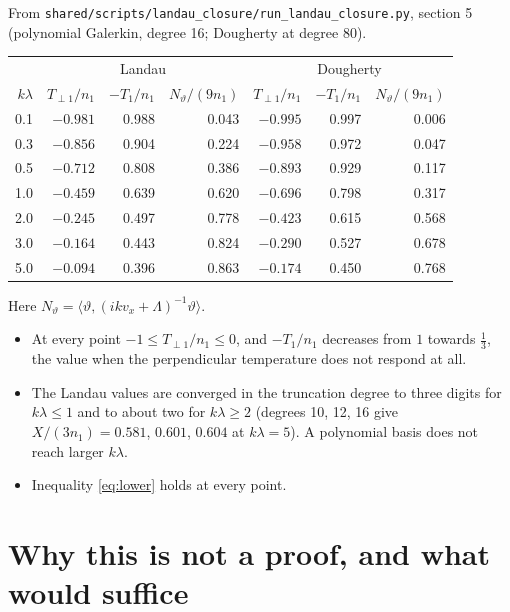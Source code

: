 \documentclass[11pt]{article}
\newcommand{\avg}[1]{\langle #1\rangle}
\newcommand{\Tperp}{T_{\perp1}}
\theoremstyle{remark}
\begin{document}
From \texttt{shared/scripts/landau\_closure/run\_landau\_closure.py},
section 5 (polynomial Galerkin, degree 16; Dougherty at degree 80).
\begin{center}
\renewcommand{\arraystretch}{1.15}
\begin{tabular}{r|rrr|rrr}
  & \multicolumn{3}{c|}{Landau} & \multicolumn{3}{c}{Dougherty} \\
  $k\lambda$ & $\Tperp/n_1$ & $-T_1/n_1$ & $N_\vartheta/(9n_1)$
     & $\Tperp/n_1$ & $-T_1/n_1$ & $N_\vartheta/(9n_1)$ \\ \hline
  0.1 & $-0.981$ & 0.988 & 0.043 & $-0.995$ & 0.997 & 0.006 \\
  0.3 & $-0.856$ & 0.904 & 0.224 & $-0.958$ & 0.972 & 0.047 \\
  0.5 & $-0.712$ & 0.808 & 0.386 & $-0.893$ & 0.929 & 0.117 \\
  1.0 & $-0.459$ & 0.639 & 0.620 & $-0.696$ & 0.798 & 0.317 \\
  2.0 & $-0.245$ & 0.497 & 0.778 & $-0.423$ & 0.615 & 0.568 \\
  3.0 & $-0.164$ & 0.443 & 0.824 & $-0.290$ & 0.527 & 0.678 \\
  5.0 & $-0.094$ & 0.396 & 0.863 & $-0.174$ & 0.450 & 0.768 \\
\end{tabular}
\end{center}
Here $N_\vartheta=\avg{\vartheta,(ikv_x+\Lambda)^{-1}\vartheta}$.
\begin{itemize}
  \item At every point $-1\le\Tperp/n_1\le0$, and $-T_1/n_1$ decreases from
    $1$ towards $\tfrac13$, the value when the perpendicular temperature does
    not respond at all.
  \item The Landau values are converged in the truncation degree to three
    digits for $k\lambda\le1$ and to about two for $k\lambda\ge2$
    (degrees 10, 12, 16 give $X/(3n_1)=0.581$, $0.601$, $0.604$ at
    $k\lambda=5$). A polynomial basis does not reach larger $k\lambda$.
  \item Inequality \eqref{eq:lower} holds at every point.
\end{itemize}

\section{Why this is not a proof, and what would suffice}
\label{sec:why}
\end{document}

